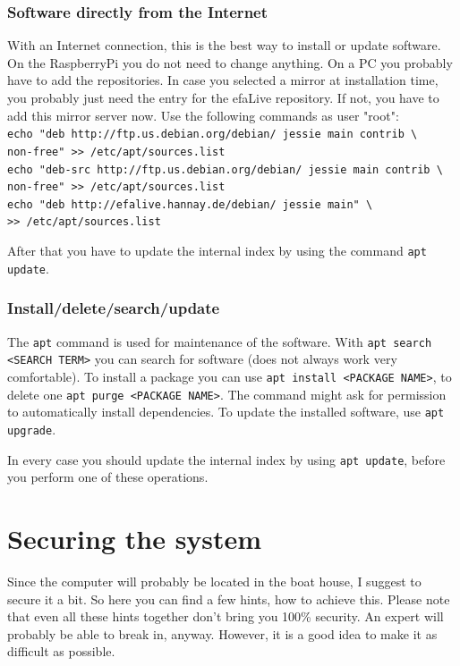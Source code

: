\documentclass[a4paper,12pt,twoside]{article}
\begin{document}
\subsubsection{Software directly from the Internet}
\label{sct:software_internet}
With an Internet connection, this is the best way to install or update
software. On the RaspberryPi you do not need to change anything. On a PC you 
probably have to add the repositories. In case you 
selected a mirror at installation time, you probably just
need the entry for the efaLive repository. If not, you have to add this mirror 
server now. Use the following commands as user "root":
\bigskip
\\
\texttt{echo "deb http://ftp.us.debian.org/debian/ jessie main contrib \textbackslash\\
    non-free"\ {\textgreater}{\textgreater} /etc/apt/sources.list}
\\
\texttt{echo "deb-src http://ftp.us.debian.org/debian/ jessie main contrib \textbackslash\\
    non-free"\ {\textgreater}{\textgreater} /etc/apt/sources.list}
\\
\texttt{echo "deb http://efalive.hannay.de/debian/ jessie main" \textbackslash\\
    {\textgreater}{\textgreater} /etc/apt/sources.list}

\bigskip
After that you have to update the internal index by using the command
\texttt{apt update}.


\subsubsection{Install/delete/search/update}
\label{sct:software_install}
The \texttt{apt} command is used for maintenance
of the software. With \texttt{apt search {\textless}SEARCH
TERM{\textgreater}} you can search for software (does not
always work very comfortable). To install a package you can use
\texttt{apt install {\textless}PACKAGE
NAME{\textgreater}}, to delete one
\texttt{apt purge {\textless}PACKAGE
NAME{\textgreater}}. The command might ask for permission
to automatically install dependencies. To update the installed
software, use \texttt{apt upgrade}.

In every case you should update the internal index by using
\texttt{apt update}, before you perform one
of these operations.


\section{Securing the system}
\label{sct:system_secure}
Since the computer will probably be
located in the boat house, I suggest to secure it a bit. So here you
can find a few hints, how to achieve this. Please note that even all
these hints together don't bring you 100\% security.
An expert will probably be able to break in, anyway. However, it is a
good idea to make it as difficult as possible.
\end{document}
